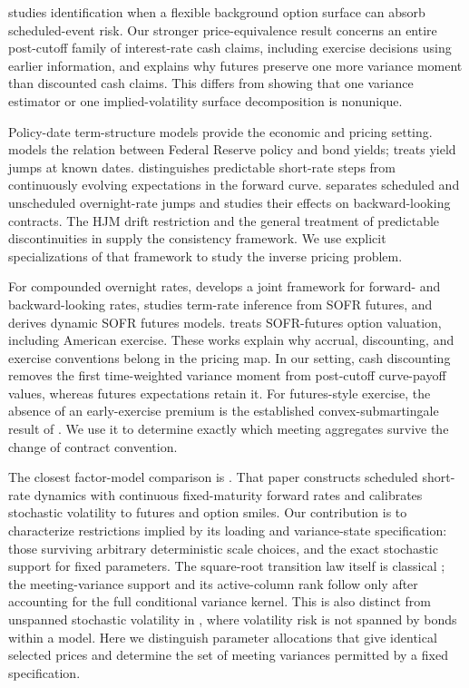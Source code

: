 \citet{zhong2026spanning} studies identification when a flexible background option surface can absorb scheduled-event risk. Our stronger price-equivalence result concerns an entire post-cutoff family of interest-rate cash claims, including exercise decisions using earlier information, and explains why futures preserve one more variance moment than discounted cash claims. This differs from showing that one variance estimator or one implied-volatility surface decomposition is nonunique.

Policy-date term-structure models provide the economic and pricing setting. \citet{piazzesi2005bond} models the relation between Federal Reserve policy and bond yields; \citet{kim2014jumps} treats yield jumps at known dates. \citet{gellert2021short} distinguishes predictable short-rate steps from continuously evolving expectations in the forward curve. \citet{backwell2021expected} separates scheduled and unscheduled overnight-rate jumps and studies their effects on backward-looking contracts. The HJM drift restriction \citep{heath1992bond} and the general treatment of predictable discontinuities in \citet{fontana2018term,fontana2022term} supply the consistency framework. We use explicit specializations of that framework to study the inverse pricing problem.

For compounded overnight rates, \citet{lyashenko2019looking} develops a joint framework for forward- and backward-looking rates, \citet{heitfield2019inferring} studies term-rate inference from SOFR futures, and \citet{skov2021dynamic} derives dynamic SOFR futures models. \citet{itkin2024semi} treats SOFR-futures option valuation, including American exercise. These works explain why accrual, discounting, and exercise conventions belong in the pricing map. In our setting, cash discounting removes the first time-weighted variance moment from post-cutoff curve-payoff values, whereas futures expectations retain it. For futures-style exercise, the absence of an early-exercise premium is the established convex-submartingale result of \citet{lieu1990option,chen1993pricing}. We use it to determine exactly which meeting aggregates survive the change of contract convention.

The closest factor-model comparison is \citet{brace2024sofr}. That paper constructs scheduled short-rate dynamics with continuous fixed-maturity forward rates and calibrates stochastic volatility to futures and option smiles. Our contribution is to characterize restrictions implied by its loading and variance-state specification: those surviving arbitrary deterministic scale choices, and the exact stochastic support for fixed parameters. The square-root transition law itself is classical \citep{malham2008square}; the meeting-variance support and its active-column rank follow only after accounting for the full conditional variance kernel. This is also distinct from unspanned stochastic volatility in \citet{collindufresne2002bonds}, where volatility risk is not spanned by bonds within a model. Here we distinguish parameter allocations that give identical selected prices and determine the set of meeting variances permitted by a fixed specification.

